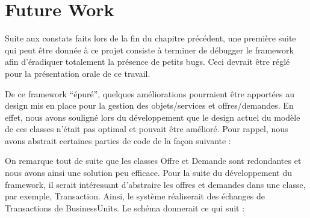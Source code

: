 \section{Future Work}

Suite aux constats faits lors de la fin du chapitre précédent,  une première suite qui peut être donnée à ce projet consiste à terminer de débugger le framework afin d'éradiquer totalement la présence de petits bugs.  Ceci devrait être réglé pour la présentation orale de ce travail.  

De ce framework ``épuré'',  quelques améliorations pourraient être apportées au design mis en place pour la gestion des objets/services et offres/demandes.  En effet,  nous avons souligné lors du développement que le design actuel du modèle de ces classes n'était pas optimal et pouvait être amélioré.  Pour rappel,  nous avons abstrait certaines parties de code de la façon suivante : 

\vspace{1cm}
\begin{center}
\end{center}
\vspace{1cm}

On remarque tout de suite que les classes Offre et Demande sont redondantes et nous avons ainsi une solution peu efficace.  Pour la suite du développement du framework,  il serait intéressant d'abstraire les offres et demandes dans une classe,  par exemple,  Transaction.  Ainsi,  le système réaliserait des échanges de Transactions de BusinessUnits.  Le schéma donnerait ce qui suit : 
\vspace{1cm}
\begin{center}
\end{center}
\vspace{1cm}

